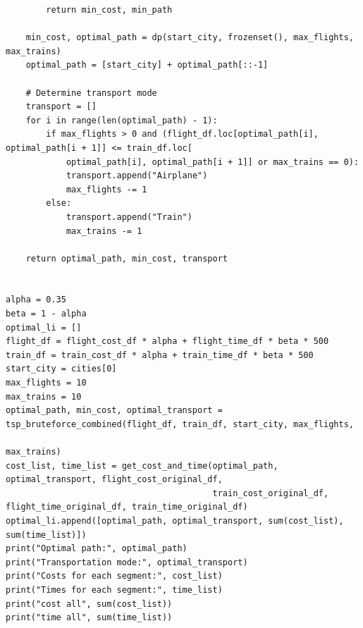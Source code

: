 \documentclass{article}
\begin{document}
\begin{lstlisting}
        return min_cost, min_path

    min_cost, optimal_path = dp(start_city, frozenset(), max_flights, max_trains)
    optimal_path = [start_city] + optimal_path[::-1]

    # Determine transport mode
    transport = []
    for i in range(len(optimal_path) - 1):
        if max_flights > 0 and (flight_df.loc[optimal_path[i], optimal_path[i + 1]] <= train_df.loc[
            optimal_path[i], optimal_path[i + 1]] or max_trains == 0):
            transport.append("Airplane")
            max_flights -= 1
        else:
            transport.append("Train")
            max_trains -= 1

    return optimal_path, min_cost, transport


alpha = 0.35
beta = 1 - alpha
optimal_li = []
flight_df = flight_cost_df * alpha + flight_time_df * beta * 500
train_df = train_cost_df * alpha + train_time_df * beta * 500
start_city = cities[0]
max_flights = 10
max_trains = 10
optimal_path, min_cost, optimal_transport = tsp_bruteforce_combined(flight_df, train_df, start_city, max_flights,
                                                                    max_trains)
cost_list, time_list = get_cost_and_time(optimal_path, optimal_transport, flight_cost_original_df,
                                         train_cost_original_df, flight_time_original_df, train_time_original_df)
optimal_li.append([optimal_path, optimal_transport, sum(cost_list), sum(time_list)])
print("Optimal path:", optimal_path)
print("Transportation mode:", optimal_transport)
print("Costs for each segment:", cost_list)
print("Times for each segment:", time_list)
print("cost all", sum(cost_list))
print("time all", sum(time_list))

  \end{lstlisting}
\end{document}
